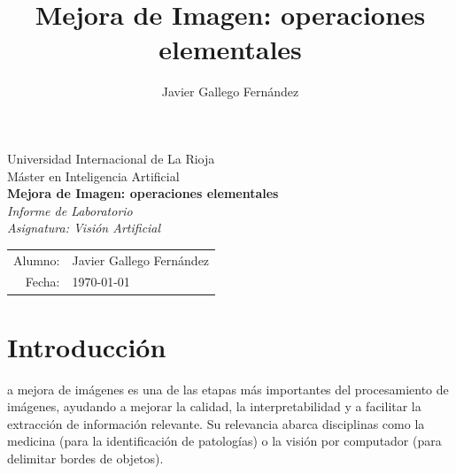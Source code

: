 \documentclass[12pt,a4paper,twoside]{rho-class/rho}
\title{Mejora de Imagen: operaciones elementales}
\author[a,1]{Javier Gallego Fernández}
\affil[a]{Máster en Inteligencia Artificial, Universidad Internacional de La Rioja (UNIR)}
\begin{document}

\onecolumn
\begin{titlepage}
    \begin{center}
        \vspace*{2.5cm}
        {\large\sffamily Universidad Internacional de La Rioja}\\[0.3em]
        {\large\sffamily Máster en Inteligencia Artificial}\\[3cm]
        {\LARGE\bfseries\sffamily Mejora de Imagen: operaciones elementales}\\[1.2cm]
        {\large\sffamily\itshape Informe de Laboratorio\\[0.3em]
        Asignatura: Visión Artificial}\\[3.5cm]
        {\normalsize\sffamily
        \begin{tabular}{rl}
            Alumno:  & Javier Gallego Fernández \\[0.3em]
            Fecha:   & \today          \\
        \end{tabular}}
    \end{center}
\end{titlepage}


\tableofcontents
\newpage


\maketitle
\thispagestyle{firststyle}


\section{Introducción}

    a mejora de imágenes es una de las etapas más importantes del procesamiento de imágenes, ayudando a mejorar la calidad, la interpretabilidad y a facilitar la extracción de información relevante. Su relevancia abarca disciplinas como la medicina (para la identificación de patologías) o la visión por computador (para delimitar bordes de objetos).
\end{document}
